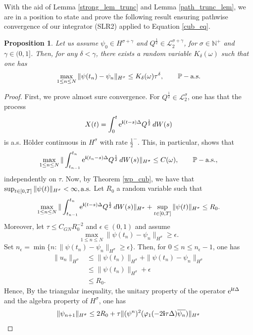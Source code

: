 \documentclass[a4paper]{amsart}
\newtheorem{proposition}[theorem]{Proposition}
\begin{document}
    With the aid of Lemma \ref{strong_lem_trunc} and Lemma \ref{path_trunc_lem}, we are in a position to state and prove the following result ensuring pathwise convergence of our integrator (SLR2) applied to Equation \eqref{cub_eq}.
    \begin{proposition}
    \label{conv_path1}
        Let us assume $\psi_0\in H^{\sigma+\gamma}$ and $Q^{\frac{1}{2}}\in\mathcal{L}_2^{\sigma+\gamma}$, for $\sigma\in \mathbb{N}^+$ and $\gamma\in(0,1]$. Then, for any $\delta<\gamma$, there exists a random variable $K_\delta(\omega)$ such that one has
        $$
        \max_{1\le n\le N}\|\psi(t_n)-\psi_n\|_{H^\sigma}\le K_\delta(\omega) \tau^\delta,\qquad \mathbb{P}-{\rm a.s.}
        $$
    \end{proposition}
    \begin{proof}
    First, we prove almost sure convergence. For $Q^{\frac{1}{2}}\in\mathcal{L}_2^{\sigma}$, one has that the process
    $$
    X(t)=\int_0^t {\rm e}^{{\bf i}(t-s)\Delta}Q^{\frac{1}{2}}\,dW(s)
    $$
    is a.s. Hölder continuous in $H^\sigma$ with rate $\frac{1}{2}^-.$ This, in particular, shows that 
    $$
    \max_{1\le n\le N}\|\int_{t_{n-1}}^{t_{n}} {\rm e}^{{\bf i}(t_n-s)\Delta}Q^{\frac{1}{2}}\,dW(s)\|_{H^\sigma} \le C(\omega), \qquad \mathbb{P}-{\rm a.s.},
    $$
    independently on $\tau$. Now, by Theorem \ref{wp_cub}, we have that $\sup_{t\in[0,T]} \|\psi(t)\|_{H^\sigma}<\infty, {\rm a.s.}$ Let $R_0$ a random variable such that
    $$
    \max_{1\le n\le N}\|\int_{t_{n-1}}^{t_{n}} {\rm e}^{{\bf i}(t-s)\Delta}Q^{\frac{1}{2}}\,dW(s)\|_{H^\sigma} +\sup_{t\in[0,T]} \|\psi(t)\|_{H^\sigma} \le R_0.
    $$
    Moreover, let $\tau\le C_{GN}R_0^{-2}$ and $\epsilon\in(0,1)$ and assume
    $$
    \max_{1\le n\le N}\|\psi(t_n)-\psi_n\|_{H^\sigma}\ge \epsilon.
    $$
    Set $n_\epsilon=\min\{n:\|\psi(t_n)-\psi_n\|_{H^\sigma}\ge \epsilon \}$. Then, for $0\le n\le n_\epsilon-1$, one has
    $$
    \begin{aligned}
        \|u_{n}\|_{H^\sigma}&\le \|\psi(t_n)\|_{H^\sigma}+\|\psi(t_n)-\psi_n\|_{H^\sigma}\\
        &\le  \|\psi(t_n)\|_{H^\sigma}+\epsilon\\
        &\le R_0.
    \end{aligned}
    $$
    Hence, By the triangular inequality, the unitary property of the operator ${\rm e}^{{\bf i}t\Delta}$ and the algebra property of $H^\sigma$, one has
    \begin{align*}
\| \psi_{n+1}\|_{H^\sigma} \le 2 R_0&+ \tau \|(\psi^n)^2(\varphi_1(-2 {\bf i} \tau \Delta)\overline{\psi_n})\|_{H^\sigma}\\

\end{align*}
\end{proof}
\end{document}
